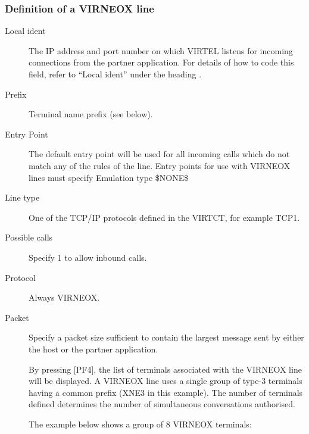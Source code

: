 \documentclass[letterpaper,10pt,english]{sphinxmanual}
\begin{document}
\subsubsection{Definition of a VIRNEOX line}
\label{\detokenize{connectivity_guide:definition-of-a-virneox-line}}\begin{description}
\item[{Local ident}] \leavevmode
The IP address and port number on which VIRTEL listens for incoming connections from the partner application. For details of how to code this field, refer to “Local ident” under the heading {\hyperref[\detokenize{connectivity_guide:bookmark13}]{}}.

\item[{Prefix}] \leavevmode
Terminal name prefix (see below).

\item[{Entry Point}] \leavevmode
The default entry point will be used for all incoming calls which do not match any of the rules of the line. Entry points for use with VIRNEOX lines must specify Emulation type \$NONE\$

\item[{Line type}] \leavevmode
One of the TCP/IP protocols defined in the VIRTCT, for example TCP1.

\item[{Possible calls}] \leavevmode
Specify 1 to allow inbound calls.

\item[{Protocol}] \leavevmode
Always VIRNEOX.

\item[{Packet}] \leavevmode
Specify a packet size sufficient to contain the largest message sent by either the host or the partner application.

By pressing {[}PF4{]}, the list of terminals associated with the VIRNEOX line will be displayed. A VIRNEOX line uses a single group of type-3 terminals having a common prefix (XNE3 in this example). The number of terminals defined determines the number of simultaneous conversations authorised.

The example below shows a group of 8 VIRNEOX terminals:

\end{description}

\end{document}
